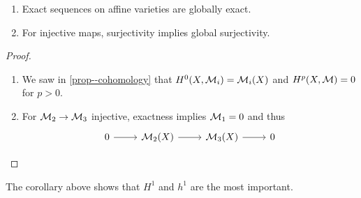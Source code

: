 \documentclass[a4paper,11pt]{article}
\begin{document}
			\begin{cor}
				\begin{enumerate}
					\item Exact sequences on affine varieties are globally exact.
					\item For injective maps, surjectivity implies global surjectivity.
				\end{enumerate}
			\end{cor}
			\begin{proof}
				\begin{enumerate}
					\item We saw in \autoref{prop--cohomology} that $H^0(X,\mathcal{M}_i)=\mathcal{M}_i(X)$ and $H^p(X,\mathcal{M})=0$ for $p>0$.
					\item For $\mathcal{M}_2\rightarrow\mathcal{M}_3$ injective, exactness implies $\mathcal{M}_1=0$ and thus 
					\begin{equation*}
						\begin{tikzcd}
							0\ar[r] & \M_2(X)\ar[r] & \M_3(X)\ar[r] & 0
						\end{tikzcd}
					\end{equation*}
				\end{enumerate}
			\end{proof}

			\begin{remark}
				The corollary above shows that $H^1$ and $h^1$ are the most important.
			\end{remark}
\end{document}
